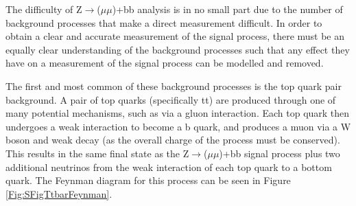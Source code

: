 \documentclass[12pt,a4paper,epsf,portrait,times,epsfig]{report}
\begin{document}
		The difficulty of Z$\rightarrow$($\mu\mu$)+bb analysis is in no small part due to the number of background processes that make a direct measurement difficult. In order to obtain a clear and accurate measurement of the signal process, there must be an equally clear understanding of the background processes such that any effect they have on a measurement of the signal process can be modelled and removed. \par
		
		The first and most common of these background processes is the top quark pair background. A pair of top quarks (specifically tt) are produced through one of many potential mechanisms, such as via a gluon interaction. Each top quark then undergoes a weak interaction to become a b quark, and produces a muon via a W boson and weak decay (as the overall charge of the process must be conserved). This results in the same final state as the Z$\rightarrow$($\mu\mu$)+bb signal process plus two additional neutrinos from the weak interaction of each top quark to a bottom quark. The Feynman diagram for this process can be seen in Figure \ref{Fig:SFigTtbarFeynman}. \par
		
\end{document}

